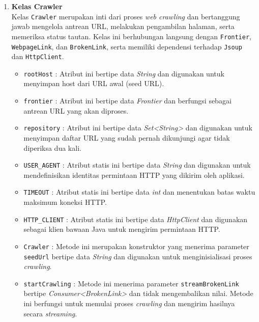 \begin{enumerate}
    \item \textbf{Kelas Crawler}\\
    Kelas \texttt{Crawler} merupakan inti dari proses \textit{web crawling} dan bertanggung jawab mengelola antrean URL, melakukan pengambilan halaman, serta memeriksa status tautan. Kelas ini berhubungan langsung dengan \texttt{Frontier}, \texttt{WebpageLink}, dan \texttt{BrokenLink}, serta memiliki dependensi terhadap \texttt{Jsoup} dan \texttt{HttpClient}.
    \begin{itemize}

        \item \texttt{rootHost} : Atribut ini bertipe data \textit{String} dan digunakan untuk menyimpan host dari URL awal (seed URL).
        
        \item \texttt{frontier} : Atribut ini bertipe data \textit{Frontier} dan berfungsi sebagai antrean URL yang akan diproses.
        
        \item \texttt{repository} : Atribut ini bertipe data \textit{Set<String>} dan digunakan untuk menyimpan daftar URL yang sudah pernah dikunjungi agar tidak diperiksa dua kali.
        
        \item \texttt{USER\_AGENT} : Atribut statis ini bertipe data \textit{String} dan digunakan untuk mendefinisikan identitas permintaan HTTP yang dikirim oleh aplikasi.
        
        \item \texttt{TIMEOUT} : Atribut statis ini bertipe data \textit{int} dan menentukan batas waktu maksimum koneksi HTTP.
        
        \item \texttt{HTTP\_CLIENT} : Atribut statis ini bertipe data \textit{HttpClient} dan digunakan sebagai klien bawaan Java untuk mengirim permintaan HTTP.

        \item \texttt{Crawler} : Metode ini merupakan konstruktor yang menerima parameter \texttt{seedUrl} bertipe data \textit{String} dan digunakan untuk menginisialisasi proses \textit{crawling}.
        
        \item \texttt{startCrawling} : Metode ini menerima parameter \texttt{streamBrokenLink} bertipe \textit{Consumer<BrokenLink>} dan tidak mengembalikan nilai. Metode ini berfungsi untuk memulai proses \textit{crawling} dan mengirim hasilnya secara \textit{streaming}.
        

\end{itemize}
\end{enumerate}
